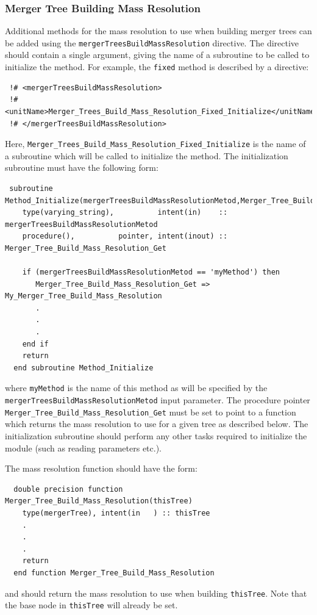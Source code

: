 \subsubsection{Merger Tree Building Mass Resolution}\label{sec:MergerTreeBuildMethodMassResolution}

Additional methods for the mass resolution to use when building merger trees can be added using the {\tt mergerTreesBuildMassResolution} directive. The directive should contain a single argument, giving the name of a subroutine to be called to initialize the method. For example, the {\tt fixed} method is described by a directive:
\begin{verbatim}
 !# <mergerTreesBuildMassResolution>
 !#  <unitName>Merger_Trees_Build_Mass_Resolution_Fixed_Initialize</unitName>
 !# </mergerTreesBuildMassResolution>
\end{verbatim}
Here, {\tt Merger\_Trees\_Build\_Mass\_Resolution\_Fixed\_Initialize} is the name of a subroutine which will be called to initialize the method. The initialization subroutine must have the following form:
\begin{verbatim}
 subroutine Method_Initialize(mergerTreesBuildMassResolutionMetod,Merger_Tree_Build_Mass_Resolution_Get)
    type(varying_string),          intent(in)    :: mergerTreesBuildMassResolutionMetod
    procedure(),          pointer, intent(inout) :: Merger_Tree_Build_Mass_Resolution_Get
    
    if (mergerTreesBuildMassResolutionMetod == 'myMethod') then
       Merger_Tree_Build_Mass_Resolution_Get => My_Merger_Tree_Build_Mass_Resolution
       .
       .
       .
    end if
    return
  end subroutine Method_Initialize
\end{verbatim}
where {\tt myMethod} is the name of this method as will be specified by the {\tt mergerTreesBuildMassResolutionMetod} input parameter. The procedure pointer {\tt Merger\_Tree\_Build\_Mass\_Resolution\_Get} must be set to point to a function which returns the mass resolution to use for a given tree as described below. The initialization subroutine should perform any other tasks required to initialize the module (such as reading parameters etc.).

The mass resolution function should have the form:
\begin{verbatim}
  double precision function Merger_Tree_Build_Mass_Resolution(thisTree)
    type(mergerTree), intent(in   ) :: thisTree
    .
    .
    .
    return
  end function Merger_Tree_Build_Mass_Resolution
\end{verbatim}
and should return the mass resolution to use when building {\tt thisTree}. Note that the base node in {\tt thisTree} will already be set.

